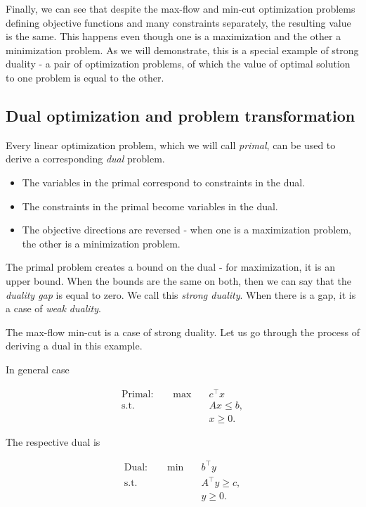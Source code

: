 \documentclass[12pt, openany]{article}
\begin{document}
Finally, we can see that despite the max-flow and min-cut optimization problems defining objective functions and many constraints separately, the resulting value is the same. This happens even though one is a maximization and the other a minimization problem. As we will demonstrate, this is a special example of strong duality - a pair of optimization problems, of which the value of optimal solution to one problem is equal to the other.

\subsection{Dual optimization and problem transformation}

Every linear optimization problem, which we will call \textit{primal}, can be used to derive a corresponding \textit{dual} problem. 
\begin{itemize}
    \item The variables in the primal correspond to constraints in the dual.
    \item The constraints in the primal become variables in the dual.
    \item The objective directions are reversed - when one is a maximization problem, the other is a minimization problem.
\end{itemize}

The primal problem creates a bound on the dual - for maximization, it is an upper bound. When the bounds are the same on both, then we can say that the \textit{duality gap} is equal to zero. We call this \textit{strong duality}. When there is a gap, it is a case of \textit{weak duality}.

The max-flow min-cut is a case of strong duality. Let us go through the process of deriving a dual in this example.

In general case

\[
\begin{aligned}
\text{Primal:} \qquad
\max \quad & c^\top x \\
\text{s.t.} \quad & Ax \le b, \\
& x \ge 0 .
\end{aligned}
\]

The respective dual is

\[
\begin{aligned}
\text{Dual:} \qquad
\min \quad & b^\top y \\
\text{s.t.} \quad & A^\top y \ge c, \\
& y \ge 0 .
\end{aligned}
\]
\end{document}
